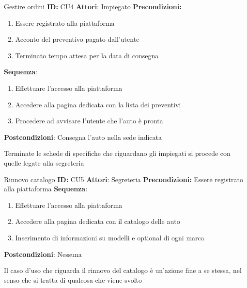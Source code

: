 \documentclass[a4paper, 11pt,oneside]{book}
\newcommand{\spacing}{\par\bigskip\noindent}
\begin{document}
        \spacing
        \begin{mybox}{Gestire ordini}
            \textbf{ID:} CU4
            \tcbline
            \textbf{Attori}: Impiegato
            \tcbline
            \textbf{Precondizioni:} 
                \begin{enumerate}
                    \item Essere registrato alla piattaforma
                    \item Acconto del preventivo pagato dall'utente
                    \item Terminato tempo attesa per la data di consegna
                \end{enumerate} 
            \tcbline
            \textbf{Sequenza}: 
                \begin{enumerate}
                    \item Effettuare l'accesso alla piattaforma
                    \item Accedere alla pagina dedicata con la lista dei preventivi
                    \item Procedere ad avvisare l'utente che l'auto è pronta
                \end{enumerate}
            \tcbline
            \textbf{Postcondizioni}: Consegna l'auto nella sede indicata
        \end{mybox}
        \spacing
        Terminate le schede di specifiche che riguardano gli impiegati si procede con quelle legate alla segreteria
        \begin{mybox}{Rinnovo catalogo}
            \textbf{ID:} CU5
            \tcbline
            \textbf{Attori}: Segreteria
            \tcbline
            \textbf{Precondizioni:} Essere registrato alla piattaforma
            \tcbline
            \textbf{Sequenza}: 
                \begin{enumerate}
                    \item Effettuare l'accesso alla piattaforma
                    \item Accedere alla pagina dedicata con il catalogo delle auto
                    \item Inserimento di informazioni su modelli e optional di ogni marca
                \end{enumerate}
            \tcbline
            \textbf{Postcondizioni}: Nessuna
        \end{mybox}
        \spacing
        Il caso d'uso che riguarda il rinnovo del catalogo è un'azione fine a se stessa, nel senso che si tratta di qualcosa che viene svolto
\end{document}
